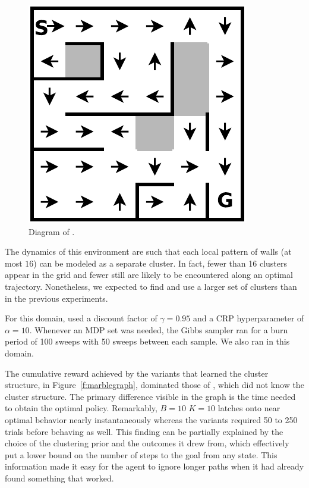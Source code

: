 \begin{figure}[t]
\begin{center}
\includegraphics[width=0.6\linewidth]{figures/6x6_maze}
\caption{Diagram of .}
\label{f:marble}
\end{center}
\end{figure}

The dynamics of this environment are such that each local pattern of
walls (at most $16$) can be modeled as a separate cluster.  In fact,
fewer than 16 clusters appear in the grid and fewer still are likely
to be encountered along an optimal trajectory.  Nonetheless, we
expected  to find and use a larger set of clusters than in the
previous experiments.

For this domain,  used a discount factor of $\gamma=0.95$ and a
CRP hyperparameter of $\alpha=10$.  Whenever an MDP set was needed,
the Gibbs sampler ran for a burn period of 100 sweeps with 50 sweeps
between each sample.  We also ran  in this domain.

The cumulative
reward achieved by the  variants that learned the cluster
structure, in Figure~\ref{f:marblegraph}, dominated those of , which did not know the cluster
structure.  The primary difference visible in the graph is the time
needed to obtain the optimal policy.  Remarkably,  $B=10$ $K=10$
latches onto near optimal behavior nearly instantaneously whereas the
 variants required 50 to 250 trials before behaving as well.
This finding can be partially explained by the choice of the clustering prior
and the outcomes it drew from, which effectively put a lower bound on
the number of steps to the goal from any state.  This information made it easy for
the agent to ignore longer paths when it had already found something that
worked.

